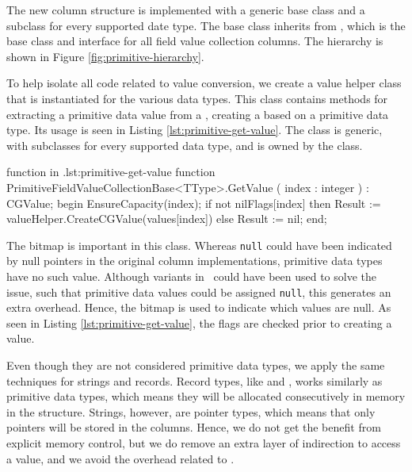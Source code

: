 The new column structure is implemented with a generic base class and a subclass for every supported date type. The base class inherits from , which is the base class and interface for all field value collection columns. The hierarchy is shown in Figure \ref{fig:primitive-hierarchy}.

To help isolate all code related to value conversion, we create a value helper class that is instantiated for the various data types. This class contains methods for extracting a primitive data value from a , creating a  based on a primitive data type. Its usage is seen in Listing \ref{lst:primitive-get-value}. The class is generic, with subclasses for every supported data type, and is owned by the  class.

\begin{delphicode}{ function in .}{lst:primitive-get-value}
function PrimitiveFieldValueCollectionBase<TType>.GetValue
( index : integer )
: CGValue;
begin
  EnsureCapacity(index);
  if not nilFlags[index] then
    Result := valueHelper.CreateCGValue(values[index])
  else
    Result := nil;
end;
\end{delphicode}


The  bitmap is important in this class. Whereas \texttt{null} could have been indicated by null pointers in the original column implementations, primitive data types have no such value. Although variants in \delphi~could have been used to solve the issue, such that primitive data values could be assigned \texttt{null}, this generates an extra overhead. Hence, the bitmap is used to indicate which values are null. As seen in Listing \ref{lst:primitive-get-value}, the flags are checked prior to creating a value.

Even though they are not considered primitive data types, we apply the same techniques for strings and records. Record types, like  and , works similarly as primitive data types, which means they will be allocated consecutively in memory in the  structure. Strings, however, are pointer types, which means that only pointers will be stored in the columns. Hence, we do not get the benefit from explicit memory control, but we do remove an extra layer of indirection to access a value, and we avoid the overhead related to .

